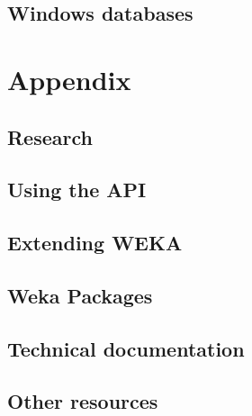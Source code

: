 \documentclass[a4paper]{book}
\begin{document}
\chapter{Windows databases}


\part{Appendix}
\chapter{Research}


\chapter{Using the API}


\chapter{Extending WEKA}


\chapter{Weka Packages}


\chapter{Technical documentation}


\chapter{Other resources}



\end{document}
